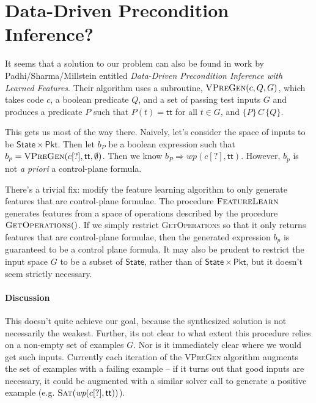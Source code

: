 \documentclass{article}
\newcommand{\TRUE}{\mathsf{tt}}
\newcommand{\Pkt}{\mathsf{Pkt}}
\newcommand{\State}{\mathsf{State}}
\newcommand{\WP}{\textit{wp}}
\newcommand{\instr}{[?]}
\begin{document}
\section{Data-Driven Precondition Inference?}


It seems that a solution to our problem can also be found in work by
Padhi/Sharma/Millstein entitled \textit{Data-Driven Precondition Inference with
  Learned Features}. Their algorithm uses a subroutine,
$\textsc{VPreGen}(c,Q,G)$, which takes code $c$, a boolean predicate $Q$,
and a set of passing test inputs $G$ and produces a predicate $P$ such that
$P(t) = \TRUE$ for all $t \in G$, and $\{P\}\,C\,\{Q\}$.

This gets us most of the way there. Naively, let's consider the space of inputs
to be $\State \times \Pkt$. Then let $b_P$ be a boolean expression such that
$b_p = \textsc{VPreGen}(c\instr,\TRUE,\emptyset)$. Then we know $b_P \Rightarrow
\WP(c\instr,\TRUE)$. However, $b_p$ is not \emph{a priori} a control-plane
formula.

There's a trivial fix: modify the feature learning algorithm to only generate
features that are control-plane formulae. The procedure $\textsc{FeatureLearn}$
generates features from a space of operations described by the procedure
$\textsc{GetOperations}()$. If we simply restrict \textsc{GetOperations} so that
it only returns features that are control-plane formulae, then the generated
expression $b_p$ is guaranteed to be a control plane formula. It may also be
prudent to restrict the input space $G$ to be a subset of $\State$, rather than
of $\State \times \Pkt$, but it doesn't seem strictly necessary.


\paragraph{Discussion} This doesn't quite achieve our goal, because the
synthesized solution is not necessarily the weakest. Further, its not clear to
what extent this procedure relies on a non-empty set of examples $G$. Nor is it
immediately clear where we would get such inputs. Currently each iteration of
the \textsc{VPreGen} algorithm augments the set of examples with a failing
example -- if it turns out that good inputs are necessary, it could be augmented
with a similar solver call to generate a positive example (e.g.
$\textsc{Sat}(\WP(c\instr,\TRUE))$).
\end{document}

